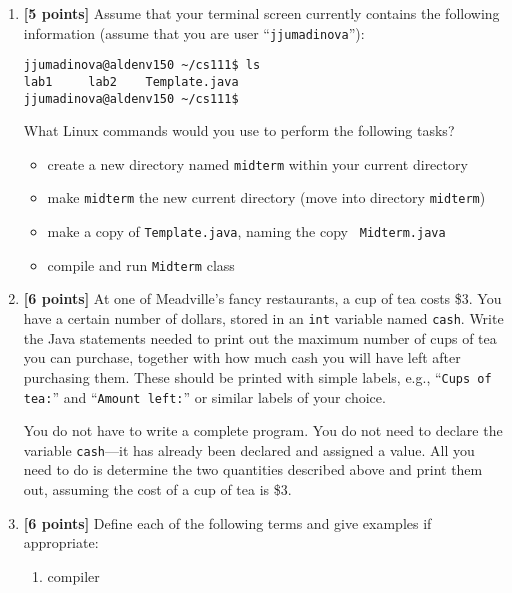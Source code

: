 \documentclass[11pt]{report}
\begin{document}
\begin{enumerate}
\item {\bf [5 points]}
Assume that your terminal screen currently contains the following information
(assume that you are user ``{\tt jjumadinova}''):
\begin{center}
\begin{minipage}{3in}
\begin{verbatim}
jjumadinova@aldenv150 ~/cs111$ ls
lab1     lab2    Template.java
jjumadinova@aldenv150 ~/cs111$ 
\end{verbatim}
\end{minipage}
\end{center}

What Linux commands would you use to perform the following tasks? 
\begin{itemize}
\item create a new directory named {\tt midterm} within your current directory
\item make {\tt midterm} the new current directory (move into directory {\tt midterm})
\item make a copy of {\tt Template.java}, naming the copy {\tt
Midterm.java}
\item compile and run {\tt Midterm} class
\end{itemize}

\vspace{2in}
\newpage

\item {\bf [6 points]}
At one of Meadville's fancy restaurants, a cup of tea costs
\$3. You have a certain number of dollars, stored in an {\tt int}
variable named {\tt cash}. Write the Java statements needed to
print out the maximum number of cups of tea you can purchase,
together with how much cash you will have left after purchasing them.
These should be printed with simple labels, e.g., ``{\tt Cups of tea:}'' 
and ``{\tt Amount left:}'' or similar labels of your choice.

You do not have to write a complete program. You do not need to declare
the variable {\tt cash}---it has already been declared and assigned a
value. All you need to do is determine the two quantities described
above and print them out,
assuming the cost of a cup of tea is \$3.

\vspace{3.5in}

\item {\bf [6 points]}
Define each of the following terms and give examples if appropriate:
\begin{enumerate}
\item compiler


\end{enumerate}
\end{enumerate}
\end{document}
